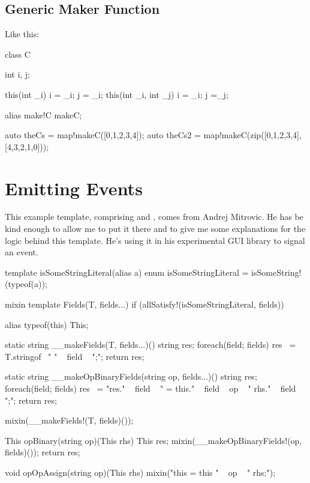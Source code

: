 
\subsection{Generic Maker Function}

Like this:

\begin{dcode}
class C
{
    int i, j;
    
    this(int _i) { i = _i; j = _i;}
    this(int _i, int _j) { i = _i; j =_j;}
}

alias make!C makeC;

auto theCs = map!makeC([0,1,2,3,4]);
auto theCs2 = map!makeC(zip([0,1,2,3,4], 
                            [4,3,2,1,0]));
\end{dcode}


\section{Emitting Events}

This example template, comprising  and , comes from Andrej Mitrovic. He has be kind enough to allow me to put it there and to give me some explanations for the logic behind this template. He's using it in his experimental GUI library to signal an event.

\begin{dcode}
template isSomeStringLiteral(alias a)
{
    enum isSomeStringLiteral = isSomeString!(typeof(a));
}

mixin template Fields(T, fields...) 
    if (allSatisfy!(isSomeStringLiteral, fields))
{
    alias typeof(this) This;

    static string __makeFields(T, fields...)()
    {
        string res;
        foreach(field; fields) res ~= T.stringof~ " " ~ field ~ ";\n";
        return res;
    }

    static string __makeOpBinaryFields(string op, fields...)()
    {
        string res;
        foreach(field; fields) 
            res ~= "res." ~ field 
                 ~ " = this." ~ field ~ op ~ " rhs." ~ field ~ ";\n";
        return res;
    }

    mixin(__makeFields!(T, fields)());

    This opBinary(string op)(This rhs)
    {
        This res;
        mixin(__makeOpBinaryFields!(op, fields)());
        return res;
    }

    void opOpAssign(string op)(This rhs)
    {
        mixin("this = this " ~ op ~ " rhs;");
    }                
}
\end{dcode}

